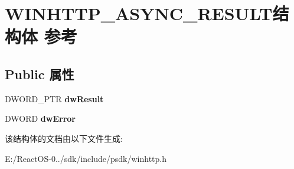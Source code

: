 \hypertarget{struct_w_i_n_h_t_t_p___a_s_y_n_c___r_e_s_u_l_t}{}\section{W\+I\+N\+H\+T\+T\+P\+\_\+\+A\+S\+Y\+N\+C\+\_\+\+R\+E\+S\+U\+L\+T结构体 参考}
\label{struct_w_i_n_h_t_t_p___a_s_y_n_c___r_e_s_u_l_t}
\subsection*{Public 属性}
\begin{DoxyCompactItemize}
\item 
\mbox{\label{struct_w_i_n_h_t_t_p___a_s_y_n_c___r_e_s_u_l_t_a749dc9edf6b64fe15255cc97607c9952}} 
D\+W\+O\+R\+D\+\_\+\+P\+TR {\bfseries dw\+Result}
\item 
\mbox{\label{struct_w_i_n_h_t_t_p___a_s_y_n_c___r_e_s_u_l_t_a8d89f91b0f8c1b3abff211d75ec15264}} 
D\+W\+O\+RD {\bfseries dw\+Error}
\end{DoxyCompactItemize}


该结构体的文档由以下文件生成\+:\begin{DoxyCompactItemize}
\item 
E\+:/\+React\+O\+S-\/0../sdk/include/psdk/winhttp.\+h\end{DoxyCompactItemize}

